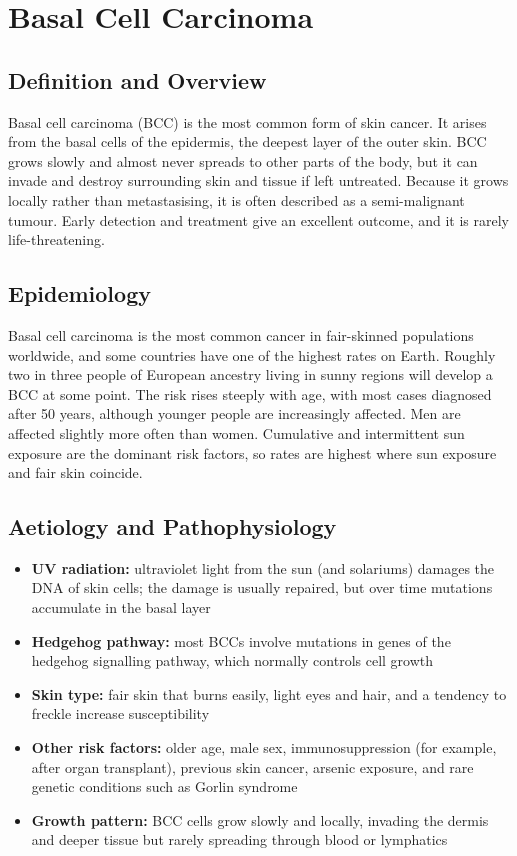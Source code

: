 \chapter{Basal Cell Carcinoma}

\section*{Definition and Overview}
Basal cell carcinoma (BCC) is the most common form of skin cancer. It arises from the basal cells of the epidermis, the deepest layer of the outer skin. BCC grows slowly and almost never spreads to other parts of the body, but it can invade and destroy surrounding skin and tissue if left untreated. Because it grows locally rather than metastasising, it is often described as a semi-malignant tumour. Early detection and treatment give an excellent outcome, and it is rarely life-threatening.

\section*{Epidemiology}
Basal cell carcinoma is the most common cancer in fair-skinned populations worldwide, and some countries have one of the highest rates on Earth. Roughly two in three people of European ancestry living in sunny regions will develop a BCC at some point. The risk rises steeply with age, with most cases diagnosed after 50 years, although younger people are increasingly affected. Men are affected slightly more often than women. Cumulative and intermittent sun exposure are the dominant risk factors, so rates are highest where sun exposure and fair skin coincide.

\section*{Aetiology and Pathophysiology}
\begin{itemize}
    \item \textbf{UV radiation:} ultraviolet light from the sun (and solariums) damages the DNA of skin cells; the damage is usually repaired, but over time mutations accumulate in the basal layer
    \item \textbf{Hedgehog pathway:} most BCCs involve mutations in genes of the hedgehog signalling pathway, which normally controls cell growth
    \item \textbf{Skin type:} fair skin that burns easily, light eyes and hair, and a tendency to freckle increase susceptibility
    \item \textbf{Other risk factors:} older age, male sex, immunosuppression (for example, after organ transplant), previous skin cancer, arsenic exposure, and rare genetic conditions such as Gorlin syndrome
    \item \textbf{Growth pattern:} BCC cells grow slowly and locally, invading the dermis and deeper tissue but rarely spreading through blood or lymphatics
\end{itemize}

